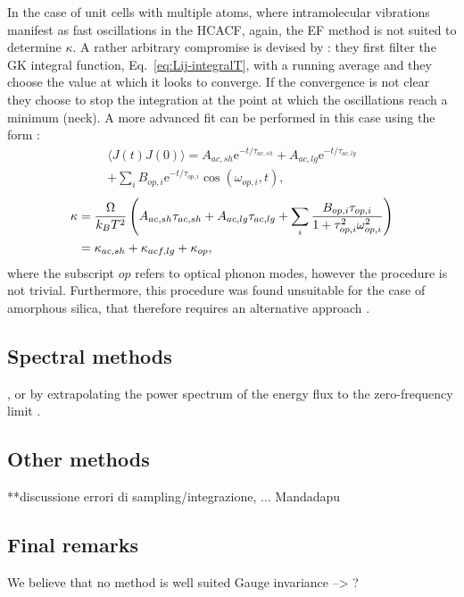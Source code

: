 \begin{LEtext}
In the case of unit cells with multiple atoms, where intramolecular vibrations manifest as fast oscillations in the HCACF, again, the EF method is not suited to determine $\kappa$. A rather arbitrary compromise is devised by \citet{McGaughey2004b}: they first filter the GK integral function, Eq.~\eqref{eq:Lij-integralT}, with a running average \cite{MovingAverage} and they choose the value at which it looks to converge. If the convergence is not clear they choose to stop the integration at the point at which the oscillations reach a minimum (neck). A more advanced fit can be performed in this case using the form \cite{McGaughey2004b}:
\begin{multline}
    \langle J(t) J(0) \rangle = A_{ac,sh} \mathrm{e}^{-t/\tau_{ac,sh}} + A_{ac,lg} \mathrm{e}^{-t/\tau_{ac,lg}} \\
        + \sum_i B_{op,i} \mathrm{e}^{-t/\tau_{op,i}} \cos(\omega_{op,i},t),
\end{multline}
\begin{equation}
    \begin{aligned}
        \kappa &= \frac{{\mathrm\Omega}}{k_B T^2} \left(A_{ac,sh}\tau_{ac,sh} + A_{ac,lg}\tau_{ac,lg} + \sum_i \frac{B_{op,i}\tau_{op,i}}{1+\tau_{op,i}^2\omega_{op,i}^2}\right) \\
        &= \kappa_{ac,sh} + \kappa_{acf,lg} + \kappa_{op},
    \end{aligned}
\end{equation}
where the subscript $op$ refers to optical phonon modes, however the procedure is not trivial. Furthermore, this procedure was found unsuitable for the case of amorphous silica, that therefore requires an alternative approach \cite{McGaughey2004b}.


\subsection{Spectral methods}
, or by extrapolating the power spectrum of the energy flux to the zero-frequency limit \citep{Volz2000}. 

\subsection{Other methods}
**discussione errori di sampling/integrazione, ... Mandadapu

\subsection{Final remarks}
We believe that no method is well suited
Gauge invariance --> ?


\end{LEtext}
